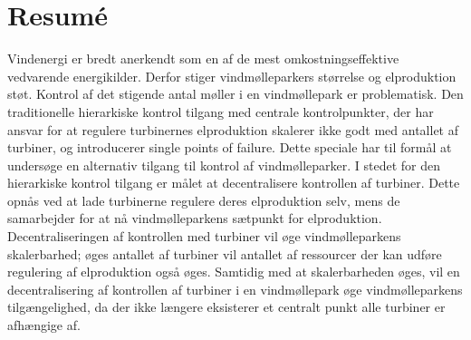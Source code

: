\chapter{Resumé}
Vindenergi er bredt anerkendt som en af de mest omkostningseffektive vedvarende energikilder.
Derfor stiger vindmølleparkers størrelse og elproduktion støt.
Kontrol af det stigende antal møller i en vindmøllepark er problematisk.
Den traditionelle hierarkiske kontrol tilgang med centrale kontrolpunkter, der har ansvar for at regulere turbinernes elproduktion skalerer ikke godt med antallet af turbiner, og introducerer single points of failure.
Dette speciale har til formål at undersøge en alternativ tilgang til kontrol af vindmølleparker.
I stedet for den hierarkiske kontrol tilgang er målet at decentralisere kontrollen af turbiner.
Dette opnås ved at lade turbinerne regulere deres elproduktion selv, mens de samarbejder for at nå vindmølleparkens sætpunkt for elproduktion.
Decentraliseringen af kontrollen med turbiner vil øge vindmølleparkens skalerbarhed; øges antallet af turbiner vil antallet af ressourcer der kan udføre regulering af elproduktion også øges.
Samtidig med at skalerbarheden øges, vil en decentralisering af kontrollen af turbiner i en vindmøllepark øge vindmølleparkens tilgængelighed, da der ikke længere eksisterer et centralt punkt alle turbiner er afhængige af.